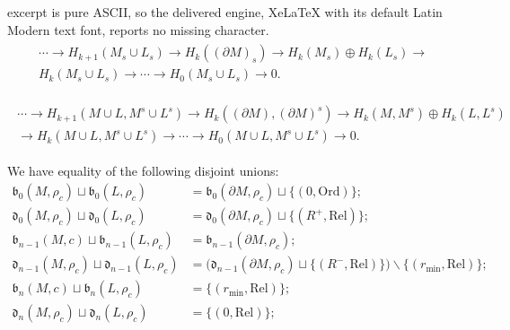 \documentclass[10pt,a4paper]{amsart}
\begin{document}
excerpt is pure ASCII, so the delivered engine, XeLaTeX with its default Latin Modern text font, reports no missing character.
\begin{align}\label{LESord}
\begin{split}
    \cdots\overset{}{\longrightarrow}H_{k+1}(M_s\cup L_s)\longrightarrow H_k((\partial M)_s)\overset{}{\longrightarrow} H_k(M_s)\oplus H_k(L_s)\overset{}{\longrightarrow} \\
   H_k(M_s\cup L_s)\overset{}{\longrightarrow}
    \cdots\longrightarrow H_0(M_s\cup L_s)\longrightarrow 0.
\end{split}
\end{align}

\begin{align}\label{LESrel}
\begin{split}
    \cdots\overset{}{\longrightarrow}H_{k+1}(M\cup L, M^s\cup L^s)\longrightarrow H_k((\partial M), (\partial M)^s)\overset{}{\longrightarrow} H_k(M,M^s)\oplus H_k(L,L^s)\\ \overset{}{\longrightarrow}
   H_k(M\cup L, M^s\cup L^s)\overset{}{\longrightarrow}
    \cdots\longrightarrow H_0(M\cup L, M^s\cup L^s)\longrightarrow 0.
\end{split} \end{align} 

\begin{lemma}\label{lem:births0}

We have equality of the following disjoint unions:
\begin{align*}
\mathfrak{b}_0(M,\rho_c)\sqcup  \mathfrak{b}_0(L,\rho_c)&= \mathfrak{b}_0(\partial M,\rho_c)\sqcup \{(0,\text{Ord})\};\\
\mathfrak{d}_0(M,\rho_c)\sqcup  \mathfrak{d}_0(L,\rho_c) &= \mathfrak{d}_0(\partial M,\rho_c)\sqcup \{(R^+,\text{Rel})\};\\
\mathfrak{b}_{n-1}(M,c)\sqcup  \mathfrak{b}_{n-1}(L,\rho_c)&= \mathfrak{b}_{n-1}(\partial M,\rho_c);\\
\mathfrak{d}_{n-1}(M,\rho_c)\sqcup  \mathfrak{d}_{n-1}(L,\rho_c)&= \big(\mathfrak{d}_{n-1}(\partial M,\rho_c)\sqcup \{(R^-,\text{Rel})\} \big)\backslash \{(r_{\min},\text{Rel})\};\\
\mathfrak{b}_n(M,c)\sqcup  \mathfrak{b}_n(L,\rho_c)&=\{(r_{\min},\text{Rel})\} ;\\
\mathfrak{d}_n(M,\rho_c)\sqcup  \mathfrak{d}_n(L,\rho_c) &= \{(0,\text{Rel})\};
\end{align*}

\end{lemma}
\end{document}
